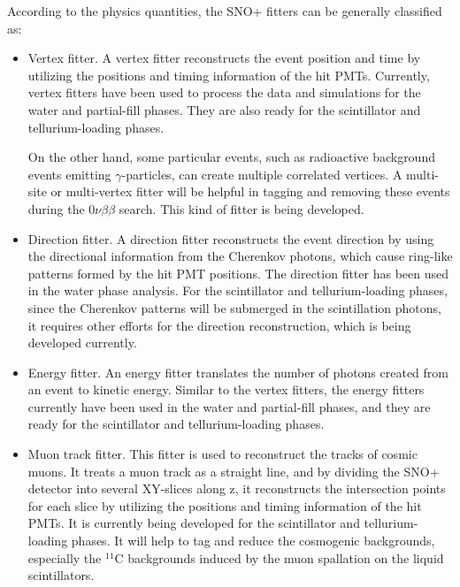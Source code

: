According to the physics quantities, the SNO+ fitters can be generally classified as:
\begin{itemize}
	\item Vertex fitter. A vertex fitter reconstructs the event position and time by utilizing the positions and timing information of the hit PMTs. Currently, vertex fitters have been used to process the data and simulations for the water and partial-fill phases. They are also ready for the scintillator and tellurium-loading phases.
	
    On the other hand, some particular events, such as radioactive background events emitting $\gamma$-particles, can create multiple correlated vertices. A multi-site or multi-vertex fitter will be helpful in tagging and removing these events during the $0\nu\beta\beta$ search. This kind of fitter is being developed.

	\item Direction fitter. A direction fitter reconstructs the event direction by using the directional information from the Cherenkov photons, which cause ring-like patterns formed by the hit PMT positions. The direction fitter has been used in the water phase analysis. For the scintillator and tellurium-loading phases, since the Cherenkov patterns will be submerged in the scintillation photons, it requires other efforts for the direction reconstruction, which is being developed currently. 
	
	\item Energy fitter. An energy fitter translates the number of photons created from an event to kinetic energy. Similar to the vertex fitters, the energy fitters currently have been used in the water and partial-fill phases, and they are ready for the scintillator and tellurium-loading phases.

	\item Muon track fitter. This fitter is used to reconstruct the tracks of cosmic muons. It treats a muon track as a straight line, and by dividing the SNO+ detector into several XY-slices along z, it reconstructs the intersection points for each slice by utilizing the positions and timing information of the hit PMTs\cite{muonTrackRecon}. It is currently being developed for the scintillator and tellurium-loading phases. It will help to tag and reduce the cosmogenic backgrounds, especially the $^{11}$C backgrounds induced by the muon spallation on the liquid scintillators\cite{sorensen2016temperature}.
\end{itemize}

